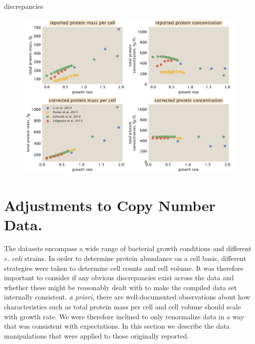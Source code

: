 discrepancies \documentclass[11pt, letterpaper]{article}
\begin{document}
\begin{figure}[H]
		\centering
    \includegraphics[width=1\textwidth]{../../figures/dataset_corrections.pdf}
  \caption{}
  \label{fig:dataset_correlations}
\end{figure}


\section{Adjustments to Copy Number Data.}



The datasets encompass a wide range of bacterial growth conditions and
different {\it e. coli} strains. In order to determine protein abundance on a
cell basis,  different strategies  were taken to determine cell counts and cell
volume. It was therefore important to consider if any obvious discrepancies
exist across the data and whether these might be reasonably dealt with to make
the compiled data set internally consistent. {\it a priori}, there are
well-documented observations about how characteristics such as total protein
mass per cell and cell volume  should scale with growth rate. We were therefore
inclined to only renormalize data in a  way  that was consistent with
expectations.
In this section we describe the data manipulations that were applied to those originally reported.
\end{document}
